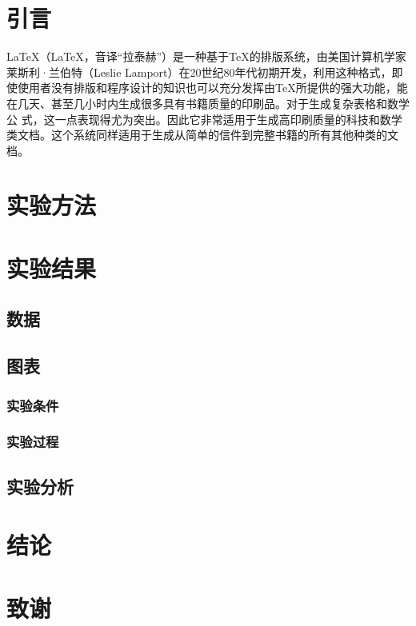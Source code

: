 \documentclass{ctexart}
\begin{document}
		\section{\mbox{引言}}
		LaTeX（\LaTeX，音译“拉泰赫”）是一种基于\TeX 的排版系统，由美国计算机学家莱斯利·兰伯特（Leslie Lamport）在20世纪80年代初期开发，利用这种格式，即	使使用者没有排版和程序设计的知识也可以充分发挥由TeX所提供的强大功能，能在几天、甚至几小时内生成很多具有书籍质量的印刷品。对于生成复杂表格和数学公	式，这一点表现得尤为突出。因此它非常适用于生成高印刷质量的科技和数学类文档。这个系统同样适用于生成从简单的信件到完整书籍的所有其他种类的文档。
		\section{\mbox{实验方法}}
		\section{\mbox{实验结果}}
		\subsection{\mbox{数据}}
		\subsection{\mbox{图表}}
		\subsubsection{\mbox{实验条件}}
		\subsubsection{\mbox{实验过程}}
		\subsection{\mbox{实验分析}}
		\section{\mbox{结论}}
		\section{\mbox{致谢}}
\end{document}
